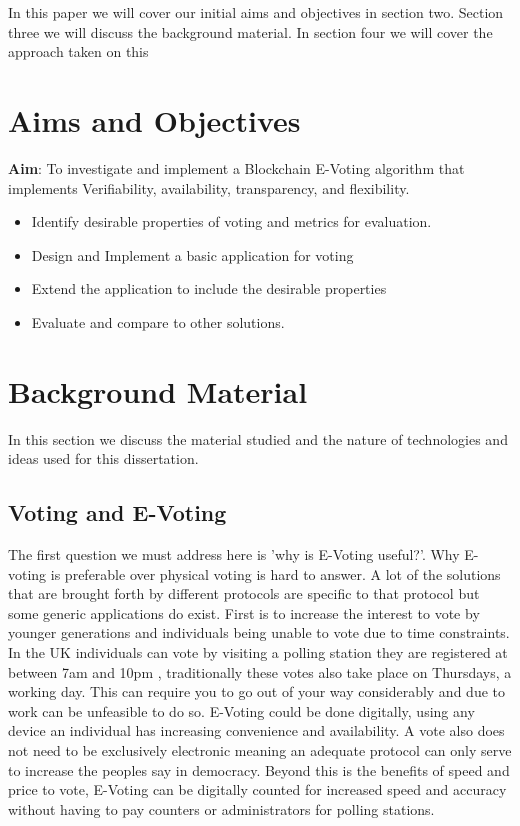 \documentclass{entcs}
\begin{document}
In this paper we will cover our initial aims and objectives in section two. Section three we will discuss the background material. In section four we will cover the approach taken on this

\section{Aims and Objectives}
\begin{center}
    {\bf Aim}: To investigate and implement a Blockchain E-Voting algorithm that implements Verifiability, availability, transparency, and flexibility. 
\end{center}
\begin{itemize}
    \item Identify desirable properties of voting and metrics for evaluation.
    \item Design and Implement a basic application for voting
    \item Extend the application to include the desirable properties
    \item Evaluate and compare to other solutions.
\end{itemize}


\section{Background Material}
In this section we discuss the material studied and the nature of technologies and ideas used for this dissertation.

\subsection{Voting and E-Voting}
The first question we must address here is 'why is E-Voting useful?'. Why E-voting is preferable over physical voting is hard to answer. A lot of the solutions that are brought forth by different protocols are specific to that protocol but some generic applications do exist. First is to increase the interest to vote by younger generations and individuals being unable to vote due to time constraints. In the UK individuals can vote by visiting a polling station they are registered at between 7am and 10pm \cite{pollStations}, traditionally these votes also take place on Thursdays, a working day. This can require you to go out of your way considerably and due to work can be unfeasible to do so. E-Voting could be done digitally, using any device an individual has increasing convenience and availability. A vote also does not need to be exclusively electronic meaning an adequate protocol can only serve to increase the peoples say in democracy. Beyond this is the benefits of speed and price to vote, E-Voting can be digitally counted for increased speed and accuracy without having to pay counters or administrators for polling stations.
\end{document}
